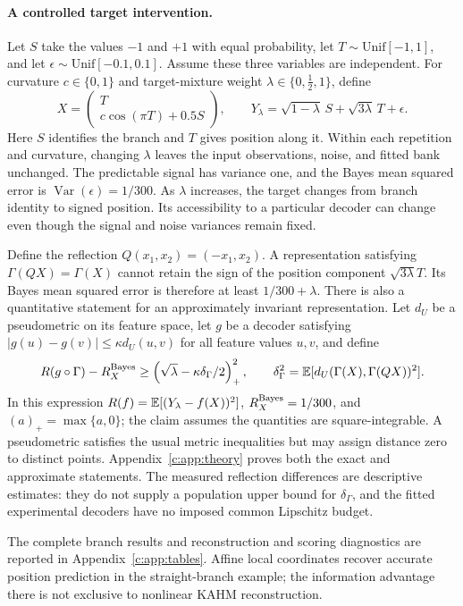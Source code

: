 \paragraph{A controlled target intervention.}\label{c:sec:controlled}
Let $S$ take the values $-1$ and $+1$ with equal probability, let
$T\sim\mathrm{Unif}[-1,1]$, and let
$\epsilon\sim\mathrm{Unif}[-0.1,0.1]$. Assume these three variables are
independent. For curvature $c\in\{0,1\}$ and target-mixture weight
$\lambda\in\{0,\tfrac12,1\}$, define
\begin{equation}\label{c:eq:branch}
 X=\begin{pmatrix}T\\c\cos(\pi T)+0.5S\end{pmatrix},\qquad
 Y_\lambda=\sqrt{1-\lambda}\,S+\sqrt{3\lambda}\,T+\epsilon.
\end{equation}
Here $S$ identifies the branch and $T$ gives position along it. Within each
repetition and curvature, changing $\lambda$ leaves the input observations,
noise, and fitted bank unchanged. The predictable signal has variance one,
and the Bayes mean squared error is $\operatorname{Var}(\epsilon)=1/300$.
As $\lambda$ increases, the target changes from branch identity to signed
position. Its accessibility to a particular decoder can change even though
the signal and noise variances remain fixed.

Define the reflection $Q(x_1,x_2)=(-x_1,x_2)$. A representation satisfying
$\Gamma(QX)=\Gamma(X)$ cannot retain the sign of the position component
$\sqrt{3\lambda}T$. Its Bayes mean squared error is therefore at least
$1/300+\lambda$. There is also a quantitative statement for an approximately
invariant representation. Let $d_U$ be a pseudometric on its feature space,
let $g$ be a decoder satisfying
$|g(u)-g(v)|\leq\kappa d_U(u,v)$ for all feature values $u,v$, and define
\begin{equation}\label{c:eq:symmetrybound}
 R(g\circ\Gamma)-R_X^{\rm Bayes}
 \geq\left(\sqrt\lambda-\kappa\delta_\Gamma/2\right)_+^2,
 \qquad
 \delta_\Gamma^2=\mathbb{E}[d_U(\Gamma(X),\Gamma(QX))^2].
\end{equation}
In this expression $R(f)=\mathbb{E}[(Y_\lambda-f(X))^2]$,
$R_X^{\rm Bayes}=1/300$, and $(a)_+=\max\{a,0\}$; the claim assumes the
quantities are square-integrable. A pseudometric satisfies the usual
metric inequalities but may assign distance zero to distinct points.
Appendix~\ref{c:app:theory} proves both the exact and approximate statements.
The measured reflection differences are descriptive estimates: they do not
supply a population upper bound for $\delta_\Gamma$, and the fitted
experimental decoders have no imposed common Lipschitz budget.

The complete branch results and reconstruction and scoring diagnostics
are reported in Appendix~\ref{c:app:tables}. Affine local coordinates
recover accurate position prediction in the straight-branch example;
the information advantage there is not exclusive to nonlinear KAHM
reconstruction.
